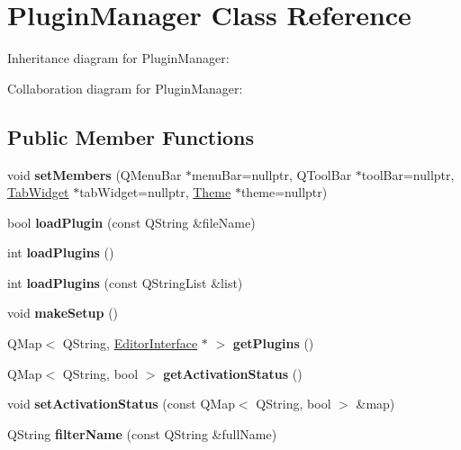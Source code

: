 \hypertarget{class_plugin_manager}{}\section{Plugin\+Manager Class Reference}
\label{class_plugin_manager}


Inheritance diagram for Plugin\+Manager\+:


Collaboration diagram for Plugin\+Manager\+:
\subsection*{Public Member Functions}
\begin{DoxyCompactItemize}
\item 
\mbox{\label{class_plugin_manager_ac8bbe57fcbdc4ae922821b0eca6d8ef4}} 
void {\bfseries set\+Members} (Q\+Menu\+Bar $\ast$menu\+Bar=nullptr, Q\+Tool\+Bar $\ast$tool\+Bar=nullptr, \hyperlink{class_tab_widget}{Tab\+Widget} $\ast$tab\+Widget=nullptr, \hyperlink{class_theme}{Theme} $\ast$theme=nullptr)
\item 
\mbox{\label{class_plugin_manager_adf335ea5cea053bd773abcd68d2f1f7a}} 
bool {\bfseries load\+Plugin} (const Q\+String \&file\+Name)
\item 
\mbox{\label{class_plugin_manager_a34bb7597b8ca8b94ac28706e75535c94}} 
int {\bfseries load\+Plugins} ()
\item 
\mbox{\label{class_plugin_manager_adccf50f27e349b431deb968c5449d1d2}} 
int {\bfseries load\+Plugins} (const Q\+String\+List \&list)
\item 
\mbox{\label{class_plugin_manager_a07af50b2add88145472b96fbce9e88a4}} 
void {\bfseries make\+Setup} ()
\item 
\mbox{\label{class_plugin_manager_a1cdb021ac2cdb92e7c064bcba7a8902f}} 
Q\+Map$<$ Q\+String, \hyperlink{class_editor_interface}{Editor\+Interface} $\ast$ $>$ {\bfseries get\+Plugins} ()
\item 
\mbox{\label{class_plugin_manager_aa983f782fadd4c4851058b750da332b1}} 
Q\+Map$<$ Q\+String, bool $>$ {\bfseries get\+Activation\+Status} ()
\item 
\mbox{\label{class_plugin_manager_ac4767e0dc3b56b1514ee4862fca5d57b}} 
void {\bfseries set\+Activation\+Status} (const Q\+Map$<$ Q\+String, bool $>$ \&map)
\item 
\mbox{\label{class_plugin_manager_a18e36dc3c5c482bab5ef09ee747607c8}} 
Q\+String {\bfseries filter\+Name} (const Q\+String \&full\+Name)
\end{DoxyCompactItemize}


